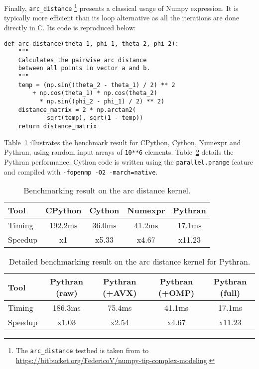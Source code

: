 \documentclass[10pt, onecolumn, preprint]{sigplanconf}
\begin{document}
Finally, \texttt{arc\_distance} \footnote{The \texttt{arc\_distance} testbed is taken from to \url{https://bitbucket.org/FedericoV/numpy-tip-complex-modeling}.} presents a classical usage of Numpy expression. It
is typically more efficient than its loop alternative as all the iterations are
done directly in C. Its code is reproduced below:

\begin{lstlisting}
def arc_distance(theta_1, phi_1, theta_2, phi_2):
    """
    Calculates the pairwise arc distance
    between all points in vector a and b.
    """
    temp = (np.sin((theta_2 - theta_1) / 2) ** 2
        + np.cos(theta_1) * np.cos(theta_2)
          * np.sin((phi_2 - phi_1) / 2) ** 2)
    distance_matrix = 2 * np.arctan2(
            sqrt(temp), sqrt(1 - temp))
    return distance_matrix
\end{lstlisting}


Table~\ref{tbl:arc-distance} illustrates the benchmark result for CPython,
Cython, Numexpr and Pythran, using random input arrays of \texttt{10**6} elements.
Table~\ref{tbl:arc-distance-2} details the Pythran performance. Cython code
is written using the \texttt{parallel.prange} feature and compiled with
\texttt{-fopenmp -O2 -march=native}.


\begin{table}
    \centering
    \begin{tabular}{|l|c|c|c|c|}
    \hline
     Tool    &  CPython    &  Cython  &  Numexpr    & Pythran   \\
    \hline
     Timing  &  192.2ms    &  36.0ms  &    41.2ms   &  17.1ms   \\
    \hline
     Speedup &  x1         &  x5.33   &  x4.67      &  x11.23   \\
    \hline
\end{tabular}
\caption{Benchmarking result on the arc distance kernel.}
\label{tbl:arc-distance}
\end{table}

\begin{table}
    \centering
    \begin{tabular}{|l|c|c|c|c|}
    \hline
    Tool & Pythran (raw) & Pythran (+AVX) & Pythran (+OMP) & Pythran (full)  \\
    \hline
    Timing & 186.3ms     &    75.4ms      &    41.1ms      &  17.1ms         \\
    \hline
    Speedup&    x1.03      &    x2.54       &    x4.67       &  x11.23         \\
    \hline
\end{tabular}
\caption{Detailed benchmarking result on the arc distance kernel for Pythran.}
\label{tbl:arc-distance-2}
\end{table}
\end{document}
